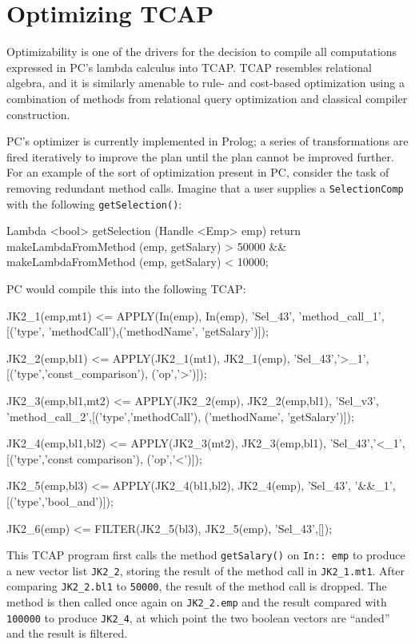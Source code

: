 
\section{Optimizing TCAP}
\label{sec:optimizer}

Optimizability is one of the drivers for
the decision to compile all computations expressed in PC's lambda calculus into TCAP.  
TCAP resembles relational algebra, and it is similarly amenable to rule- and cost-based optimization
using a combination of methods from relational query optimization and classical compiler construction.

PC's optimizer is currently implemented
in Prolog; a series of transformations are fired iteratively to improve the plan until the plan cannot be improved further.
For an example of the sort of optimization present in PC, consider the task of removing redundant method calls.  Imagine that a user
supplies a \texttt{SelectionComp} with the following \texttt{getSelection()}:

\begin{codesmall} 
Lambda <bool> getSelection (Handle  <Emp> emp) {
   return makeLambdaFromMethod
      (emp, getSalary) > 50000 &&
      makeLambdaFromMethod (emp, getSalary) < 10000;
}	
\end{codesmall}

\noindent PC would compile this into the following TCAP:

\begin{codesmall}
JK2_1(emp,mt1) <= APPLY(In(emp), In(emp), 'Sel_43',
  'method_call_1',[('type', 'methodCall'),('methodName',
  'getSalary')]);

JK2_2(emp,bl1) <= APPLY(JK2_1(mt1), JK2_1(emp), 
  'Sel_43','>_1',[('type','const_comparison'),
   ('op','>')]);

JK2_3(emp,bl1,mt2) <= APPLY(JK2_2(emp), JK2_2(emp,bl1), 
  'Sel_v3', 'method_call_2',[('type','methodCall'), 
  ('methodName', 'getSalary')]);

JK2_4(emp,bl1,bl2) <= APPLY(JK2_3(mt2), JK2_3(emp,bl1), 
  'Sel_43','<_1',[('type','const comparison'),
  ('op','<')]);

JK2_5(emp,bl3) <= APPLY(JK2_4(bl1,bl2), JK2_4(emp), 
  'Sel_43', '&&_1',[('type','bool_and')]);

JK2_6(emp) <= FILTER(JK2_5(bl3), JK2_5(emp), 'Sel_43',[]);
\end{codesmall}

\noindent
This TCAP program first calls the method \texttt{getSalary()} on
\texttt{In:: emp} to produce a new vector list \texttt{JK2\_2}, storing the result
of the method call in \texttt{JK2\_1.mt1}.  After comparing \texttt{JK2\_2.bl1} to \texttt{50000}, the result of the method call is dropped.
The method is then called once again on \texttt{JK2\_2.emp} and the result compared with \texttt{100000} to produce \texttt{JK2\_4}, at which 
point the two boolean vectors are ``anded'' and the result is filtered.

